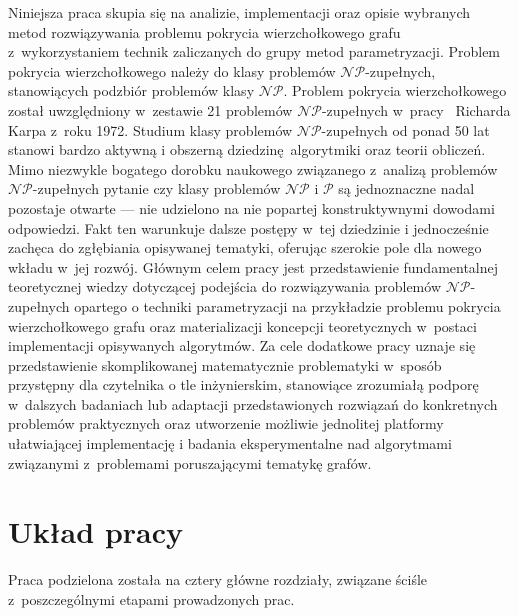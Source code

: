 \par{
  Niniejsza praca skupia się na analizie, implementacji oraz opisie wybranych metod rozwiązywania problemu pokrycia wierzchołkowego grafu z~wykorzystaniem technik zaliczanych do grupy metod parametryzacji.
  Problem pokrycia wierzchołkowego należy do klasy problemów $\mathcal{NP}$-zupełnych, stanowiących podzbiór problemów klasy $\mathcal{NP}$.
  Problem pokrycia wierzchołkowego został uwzględniony w~zestawie 21 problemów $\mathcal{NP}$-zupełnych w~pracy~\cite{DBLP:Karp10} Richarda Karpa z~roku 1972.
  Studium klasy problemów $\mathcal{NP}$-zupełnych od ponad 50 lat stanowi bardzo aktywną i obszerną dziedzinę algorytmiki oraz teorii obliczeń.
  Mimo niezwykle bogatego dorobku naukowego związanego z~analizą problemów $\mathcal{NP}$-zupełnych pytanie czy klasy problemów $\mathcal{NP}$ i $\mathcal{P}$ są jednoznaczne nadal pozostaje otwarte --- nie udzielono na nie popartej konstruktywnymi dowodami odpowiedzi.
  Fakt ten warunkuje dalsze postępy w~tej dziedzinie i jednocześnie zachęca do zgłębiania opisywanej tematyki, oferując szerokie pole dla nowego wkładu w~jej rozwój.
  Głównym celem pracy jest przedstawienie fundamentalnej teoretycznej wiedzy dotyczącej podejścia do rozwiązywania problemów $\mathcal{NP}$-zupełnych opartego o techniki parametryzacji na przykładzie problemu pokrycia wierzchołkowego grafu oraz materializacji koncepcji teoretycznych w~postaci implementacji opisywanych algorytmów.
  Za cele dodatkowe pracy uznaje się przedstawienie skomplikowanej matematycznie problematyki w~sposób przystępny dla czytelnika o tle inżynierskim, stanowiące zrozumiałą podporę w~dalszych badaniach lub adaptacji przedstawionych rozwiązań do konkretnych problemów praktycznych oraz utworzenie możliwie jednolitej platformy ułatwiającej implementację i badania eksperymentalne nad algorytmami związanymi z~problemami poruszającymi tematykę grafów.
}
\section{Układ pracy}\label{Section_Layout}
\par{
  Praca podzielona została na cztery główne rozdziały, związane ściśle z~poszczególnymi etapami prowadzonych prac.
}
